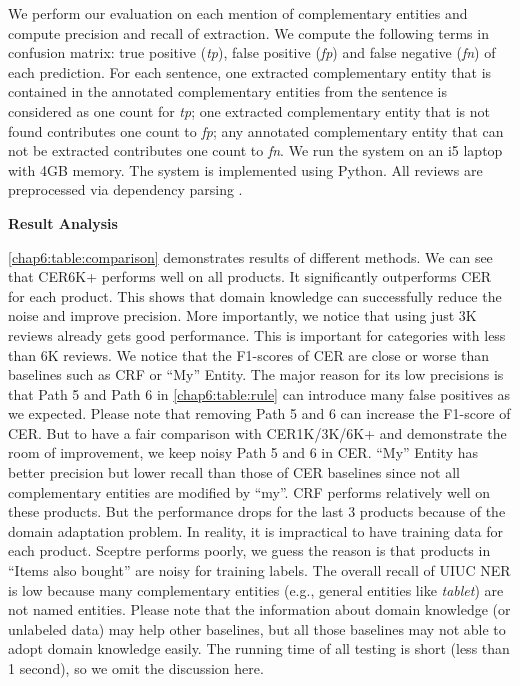 We perform our evaluation on each mention of complementary entities and compute precision and recall of extraction. We compute the following terms in confusion matrix: true positive (\textit{tp}), false positive (\textit{fp}) and false negative (\textit{fn}) of each prediction. For each sentence, one extracted complementary entity that is contained in the annotated complementary entities from the sentence is considered as one count for \textit{tp}; one extracted complementary entity that is not found contributes one count to \textit{fp}; any annotated complementary entity that can not be extracted contributes one count to \textit{fn}. We run the system on an i5 laptop with 4GB memory. The system is implemented using Python. All reviews are preprocessed via dependency parsing \cite{de2008stanford}. 

\textbf{Result Analysis}

\ref{chap6:table:comparison} demonstrates results of different methods. We can see that CER6K+ performs well on all products. It significantly outperforms CER for each product. This shows that domain knowledge can successfully reduce the noise and improve precision. More importantly, we notice that using just 3K reviews already gets good performance. This is important for categories with less than 6K reviews. We notice that the F1-scores of CER are close or worse than baselines such as CRF or ``My'' Entity. The major reason for its low precisions is that Path 5 and Path 6 in \ref{chap6:table:rule} can introduce many false positives as we expected. Please note that removing Path 5 and 6 can increase the F1-score of CER. But to have a fair comparison with CER1K/3K/6K+ and demonstrate the room of improvement, we keep noisy Path 5 and 6 in CER. ``My'' Entity has better precision but lower recall than those of CER baselines since not all complementary entities are modified by ``my''. CRF performs relatively well on these products. But the performance drops for the last 3 products because of the domain adaptation problem. In reality, it is impractical to have training data for each product. Sceptre performs poorly, we guess the reason is that products in ``Items also bought'' are noisy for training labels. The overall recall of UIUC NER is low because many complementary entities (e.g., general entities like \textit{tablet}) are not named entities. Please note that the information about domain knowledge (or unlabeled data) may help other baselines, but all those baselines may not able to adopt domain knowledge easily. The running time of all testing is short (less than 1 second), so we omit the discussion here.


